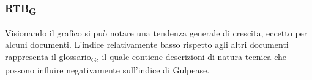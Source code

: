 \subsubsection*{\href{https://7last.github.io/docs/pb/documentazione-interna/glossario\#requirements-and-technology-baseline}{RTB\textsubscript{G}}}
Visionando il grafico si può notare una tendenza generale di crescita, eccetto per alcuni documenti. L'indice relativamente basso rispetto agli altri documenti rappresenta il \href{https://7last.github.io/docs/pb/documentazione-interna/glossario\#glossario}{glossario\textsubscript{G}}, il quale contiene descrizioni di natura tecnica che possono influire negativamente sull'indice di Gulpease.

\newpage
